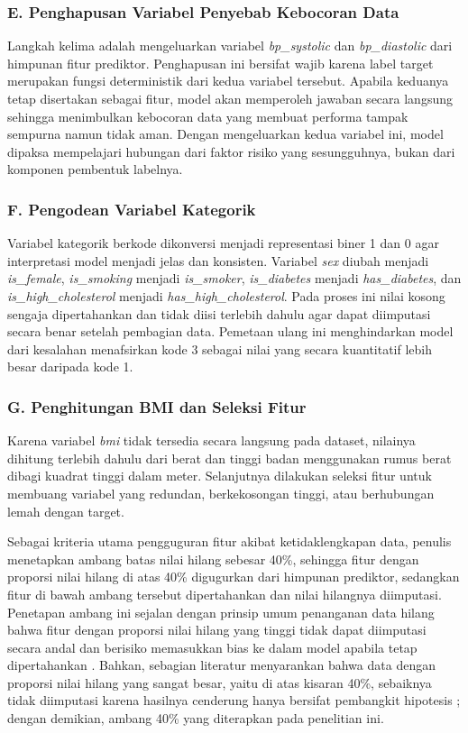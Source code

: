 \subsubsection*{E. Penghapusan Variabel Penyebab Kebocoran Data}
Langkah kelima adalah mengeluarkan variabel \textit{bp\_systolic} dan \textit{bp\_diastolic} dari himpunan fitur prediktor. Penghapusan ini bersifat wajib karena label target merupakan fungsi deterministik dari kedua variabel tersebut. Apabila keduanya tetap disertakan sebagai fitur, model akan memperoleh jawaban secara langsung sehingga menimbulkan kebocoran data yang membuat performa tampak sempurna namun tidak aman. Dengan mengeluarkan kedua variabel ini, model dipaksa mempelajari hubungan dari faktor risiko yang sesungguhnya, bukan dari komponen pembentuk labelnya.

\subsubsection*{F. Pengodean Variabel Kategorik}
Variabel kategorik berkode dikonversi menjadi representasi biner 1 dan 0 agar interpretasi model menjadi jelas dan konsisten. Variabel \textit{sex} diubah menjadi \textit{is\_female}, \textit{is\_smoking} menjadi \textit{is\_smoker}, \textit{is\_diabetes} menjadi \textit{has\_diabetes}, dan \textit{is\_high\_cholesterol} menjadi \textit{has\_high\_cholesterol}. Pada proses ini nilai kosong sengaja dipertahankan dan tidak diisi terlebih dahulu agar dapat diimputasi secara benar setelah pembagian data. Pemetaan ulang ini menghindarkan model dari kesalahan menafsirkan kode 3 sebagai nilai yang secara kuantitatif lebih besar daripada kode 1.

\subsubsection*{G. Penghitungan BMI dan Seleksi Fitur}
Karena variabel \textit{bmi} tidak tersedia secara langsung pada dataset, nilainya dihitung terlebih dahulu dari berat dan tinggi badan menggunakan rumus berat dibagi kuadrat tinggi dalam meter. Selanjutnya dilakukan seleksi fitur untuk membuang variabel yang redundan, berkekosongan tinggi, atau berhubungan lemah dengan target.

Sebagai kriteria utama pengguguran fitur akibat ketidaklengkapan data, penulis menetapkan ambang batas nilai hilang sebesar 40\%, sehingga fitur dengan proporsi nilai hilang di atas 40\% digugurkan dari himpunan prediktor, sedangkan fitur di bawah ambang tersebut dipertahankan dan nilai hilangnya diimputasi. Penetapan ambang ini sejalan dengan prinsip umum penanganan data hilang bahwa fitur dengan proporsi nilai hilang yang tinggi tidak dapat diimputasi secara andal dan berisiko memasukkan bias ke dalam model apabila tetap dipertahankan \autocite{kang2013missing}. Bahkan, sebagian literatur menyarankan bahwa data dengan proporsi nilai hilang yang sangat besar, yaitu di atas kisaran 40\%, sebaiknya tidak diimputasi karena hasilnya cenderung hanya bersifat pembangkit hipotesis \autocite{jakobsen2017missing}; dengan demikian, ambang 40\% yang diterapkan pada penelitian ini.

